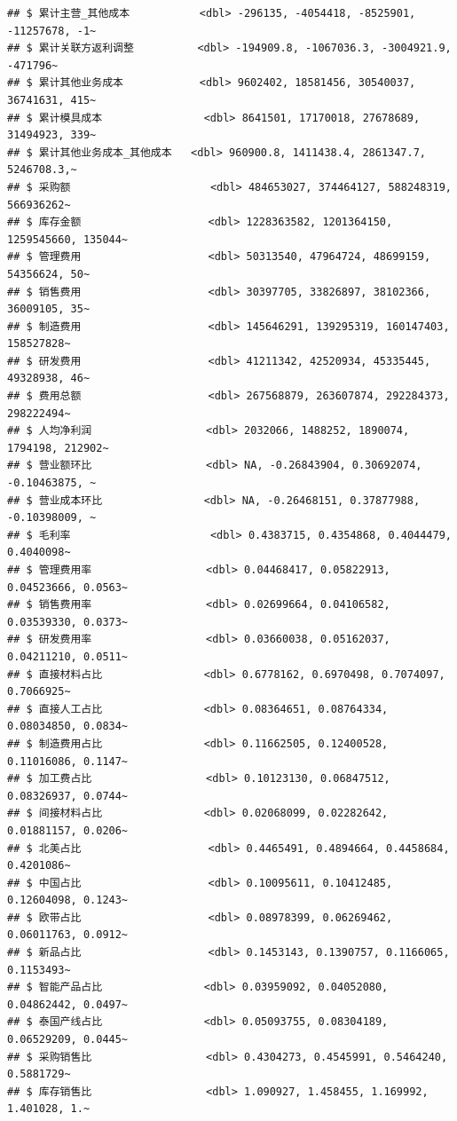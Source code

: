 \documentclass[
]{article}
\begin{document}
\begin{verbatim}
## $ 累计主营_其他成本           <dbl> -296135, -4054418, -8525901, -11257678, -1~
## $ 累计关联方返利调整          <dbl> -194909.8, -1067036.3, -3004921.9, -471796~
## $ 累计其他业务成本            <dbl> 9602402, 18581456, 30540037, 36741631, 415~
## $ 累计模具成本                <dbl> 8641501, 17170018, 27678689, 31494923, 339~
## $ 累计其他业务成本_其他成本   <dbl> 960900.8, 1411438.4, 2861347.7, 5246708.3,~
## $ 采购额                      <dbl> 484653027, 374464127, 588248319, 566936262~
## $ 库存金额                    <dbl> 1228363582, 1201364150, 1259545660, 135044~
## $ 管理费用                    <dbl> 50313540, 47964724, 48699159, 54356624, 50~
## $ 销售费用                    <dbl> 30397705, 33826897, 38102366, 36009105, 35~
## $ 制造费用                    <dbl> 145646291, 139295319, 160147403, 158527828~
## $ 研发费用                    <dbl> 41211342, 42520934, 45335445, 49328938, 46~
## $ 费用总额                    <dbl> 267568879, 263607874, 292284373, 298222494~
## $ 人均净利润                  <dbl> 2032066, 1488252, 1890074, 1794198, 212902~
## $ 营业额环比                  <dbl> NA, -0.26843904, 0.30692074, -0.10463875, ~
## $ 营业成本环比                <dbl> NA, -0.26468151, 0.37877988, -0.10398009, ~
## $ 毛利率                      <dbl> 0.4383715, 0.4354868, 0.4044479, 0.4040098~
## $ 管理费用率                  <dbl> 0.04468417, 0.05822913, 0.04523666, 0.0563~
## $ 销售费用率                  <dbl> 0.02699664, 0.04106582, 0.03539330, 0.0373~
## $ 研发费用率                  <dbl> 0.03660038, 0.05162037, 0.04211210, 0.0511~
## $ 直接材料占比                <dbl> 0.6778162, 0.6970498, 0.7074097, 0.7066925~
## $ 直接人工占比                <dbl> 0.08364651, 0.08764334, 0.08034850, 0.0834~
## $ 制造费用占比                <dbl> 0.11662505, 0.12400528, 0.11016086, 0.1147~
## $ 加工费占比                  <dbl> 0.10123130, 0.06847512, 0.08326937, 0.0744~
## $ 间接材料占比                <dbl> 0.02068099, 0.02282642, 0.01881157, 0.0206~
## $ 北美占比                    <dbl> 0.4465491, 0.4894664, 0.4458684, 0.4201086~
## $ 中国占比                    <dbl> 0.10095611, 0.10412485, 0.12604098, 0.1243~
## $ 欧带占比                    <dbl> 0.08978399, 0.06269462, 0.06011763, 0.0912~
## $ 新品占比                    <dbl> 0.1453143, 0.1390757, 0.1166065, 0.1153493~
## $ 智能产品占比                <dbl> 0.03959092, 0.04052080, 0.04862442, 0.0497~
## $ 泰国产线占比                <dbl> 0.05093755, 0.08304189, 0.06529209, 0.0445~
## $ 采购销售比                  <dbl> 0.4304273, 0.4545991, 0.5464240, 0.5881729~
## $ 库存销售比                  <dbl> 1.090927, 1.458455, 1.169992, 1.401028, 1.~
\end{verbatim}
\end{document}

